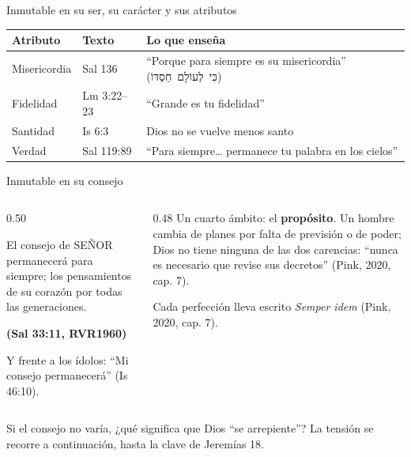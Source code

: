 \documentclass[hyperref={bookmarks=false},aspectratio=169]{beamer}
\newcommand{\heb}[1]{\mbox{\foreignlanguage{hebrew}{#1}}}
\newcommand{\SENOR}{S{\fontsize{0.78em}{1em}\selectfont EÑOR}}
\newcommand{\fuente}[1]{\par\hfill{\upshape\bfseries\footnotesize\textcolor{azul}{#1}}}
\newcommand{\destacar}[1]{\textbf{\textcolor{azul}{#1}}}
\begin{document}
\begin{frame}{Inmutable en su ser, su carácter y sus atributos}
\centering
{}\par\medskip
\scriptsize\renewcommand{\arraystretch}{1.12}
\begin{tabular}{@{}>{\RaggedRight\arraybackslash}p{2.0cm}>{\RaggedRight\arraybackslash}p{3.0cm}>{\RaggedRight\arraybackslash}p{6.6cm}@{}}
\toprule
\textbf{Atributo} & \textbf{Texto} & \textbf{Lo que enseña} \\ \midrule
Misericordia & Sal 136 & ``Porque para siempre es su misericordia'' (\heb{כִּי לְעוֹלָם חַסְדּוֹ}) \\
Fidelidad & Lm 3:22--23 & ``Grande es tu fidelidad'' \\
Santidad & Is 6:3 & Dios no se vuelve menos santo \\
Verdad & Sal 119:89 & ``Para siempre\ldots{} permanece tu palabra en los cielos'' \\
\bottomrule
\end{tabular}
\end{frame}

\begin{frame}{Inmutable en su consejo}
\begin{columns}[c,onlytextwidth]
\begin{column}{0.50\textwidth}
\begin{cita}El consejo de \SENOR{} permanecerá para siempre; los pensamientos de su corazón por todas las generaciones.\fuente{(Sal 33:11, RVR1960)}\end{cita}
\small Y frente a los ídolos: ``Mi consejo permanecerá'' (Is 46:10).
\end{column}
\begin{column}{0.48\textwidth}\small
Un cuarto ámbito: el \destacar{propósito}. Un hombre cambia de planes por falta de previsión o de poder; Dios no tiene ninguna de las dos carencias: ``nunca es necesario que revise sus decretos'' (Pink, 2020, cap. 7).\par\medskip
Cada perfección lleva escrito \emph{Semper idem} (Pink, 2020, cap. 7).
\end{column}
\end{columns}\par\medskip
\small\RaggedRight Si el consejo no varía, ¿qué significa que Dios ``se arrepiente''? La tensión se recorre a continuación, hasta la clave de Jeremías 18.
\end{frame}
\end{document}
